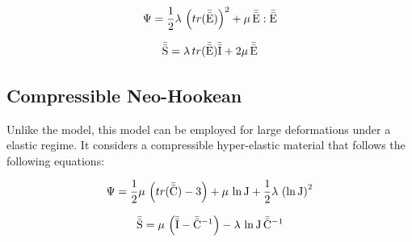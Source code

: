 \begin{equation} \label{eq:psi_svt}
    \Psi = \frac{1}{2} \lambda \, \left( tr(\bar{\bar{\mathrm{E}}}) \right)^2 + \mu \, \bar{\bar{\mathrm{E}}} : \bar{\bar{\mathrm{E}}}
\end{equation}

\begin{equation} \label{eq:pk2_svt}
    \bar{\bar{\mathrm{S}}} = \lambda \, tr(\bar{\bar{\mathrm{E}}}) \bar{\bar{\mathrm{I}}} + 2\mu \,\bar{\bar{\mathrm{E}}}
\end{equation}

\subsection{Compressible Neo-Hookean} \label{mat:nh}

Unlike the  model, this model can be employed for large deformations under a elastic regime. It considers a compressible hyper-elastic material that follows the following equations:

\begin{equation} \label{eq:psi_nh}
    \Psi = \frac{1}{2} \mu \, \left( tr(\bar{\bar{\mathrm{C}}}) - 3 \right) + \mu \, \ln{\mathrm{J}} + \frac{1}{2} \lambda \, \left( \ln{\mathrm{J}} \right)^2
\end{equation}

\begin{equation} \label{eq:pk2_nh}
    \bar{\bar{\mathrm{S}}} = \mu \, \left(\bar{\bar{\mathrm{I}}} - \bar{\bar{\mathrm{C}}}^{-1} \right) - \lambda \, \ln{\mathrm{J}} \, \bar{\bar{\mathrm{C}}}^{-1}
\end{equation}